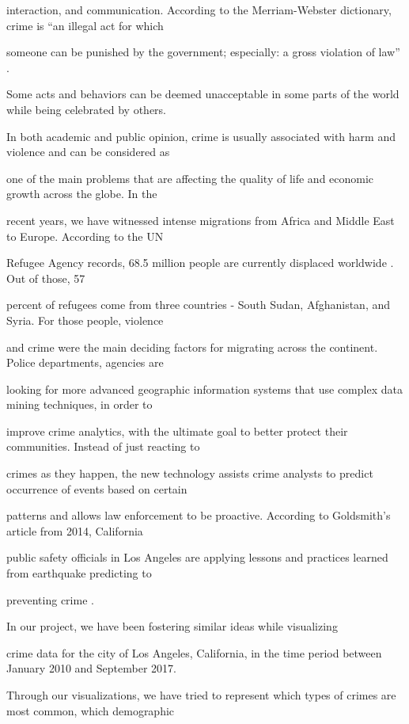 \documentclass[sigconf]{acmart}
\begin{document}
interaction, and communication. According to the Merriam-Webster dictionary, crime is ``an illegal act for which 

someone can be punished by the government; especially: a gross violation of law'' \cite{www-merriam-webster}. 

Some acts and behaviors can be deemed unacceptable in some parts of the world while being celebrated by others. 

In both academic and public opinion, crime is usually associated with harm and violence and can be considered as 

one of the main problems that are affecting the quality of life and economic growth across the globe. In the 

recent years, we have witnessed intense migrations from Africa and Middle East to Europe. According to the UN 

Refugee Agency records, 68.5 million people are currently displaced worldwide \cite{www-UNHCR}. Out of those, 57 

percent of refugees come from three countries - South Sudan, Afghanistan, and Syria. For those people, violence 

and crime were the main deciding factors for migrating across the continent. Police departments, agencies are 

looking for more advanced geographic information systems that use complex data mining techniques, in order to 

improve crime analytics, with the ultimate goal to better protect their communities. Instead of just reacting to 

crimes as they happen, the new technology assists crime analysts to predict occurrence of events based on certain 

patterns and allows law enforcement to be proactive. According to Goldsmith's article from 2014, California 

public safety officials in Los Angeles are applying lessons and practices learned from earthquake predicting to 

preventing crime \cite{www-datasmart}.

In our project, we have been fostering similar ideas while visualizing 

crime data for the city of Los Angeles, California, in the time period between January 2010 and September 2017. 

Through our visualizations, we have tried to represent which types of crimes are most common, which demographic 
\end{document}
